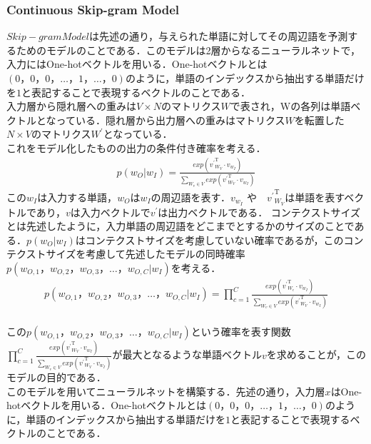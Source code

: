 \subsubsection{Continuous Skip-gram Model}
\label{tech:skipgram}
$ Skip-gram Model $は先述の通り，与えられた単語に対してその周辺語を予測するためのモデルのことである．このモデルは2層からなるニューラルネットで，入力にはOne-hotベクトルを用いる．One-hotベクトルとは$ (0，0，0， \ldots ，1， \ldots ，0) $のように，単語のインデックスから抽出する単語だけを$ 1 $と表記することで表現するベクトルのことである．\\
入力層から隠れ層への重みは$ V \times N $のマトリクス$ W $で表され，Wの各列は単語ベクトルとなっている．隠れ層から出力層への重みはマトリクス$ W $を転置した$ N \times V $のマトリクス$ W^{\prime} $となっている．\\
これをモデル化したものの出力の条件付き確率を考える．
\begin{align}
p(w_{O}|w_{I}) = \frac{exp({{v^{\prime}}^{\mathrm{T}}_{W_{V}}} \cdot v_{w_{I}})}{\sum_{W_{v} \in{V}}exp({{v^{\prime}}^{\mathrm{T}}_{W_{V}}} \cdot v_{w_{I}})} \label{eq:kakuritu}
\end{align}
この$ w_{I} $は入力する単語，$ w_{O} $は$ w_{I} $の周辺語を表す．$ v_{w_{I}} $ や　$ {v^{\prime}}^{\mathrm{T}}_{W_{V}} $は単語を表すベクトルであり，$ v $は入力ベクトルで$ v^{\prime} $は出力ベクトルである．
コンテクストサイズとは先述したように，入力単語の周辺語をどこまでとするかのサイズのことである．$ p(w_{O}|w_{I}) $はコンテクストサイズを考慮していない確率であるが，このコンテクストサイズを考慮して先述したモデルの同時確率$ p(w_{O,1}，w_{O,2}，w_{O,3}， \ldots ，w_{O,C}|w_{I}) $を考える．
\begin{align}
p(w_{O,1}，w_{O,2}，w_{O,3}， \ldots ，w_{O,C}|w_{I}) = \prod_{c=1}^{C} \frac{exp({{v^{\prime}}^{\mathrm{T}}_{W_{c}}} \cdot v_{w_{I}})}{\sum_{W_{v} \in{V}}exp({{v^{\prime}}^{\mathrm{T}}_{W_{V}}} \cdot v_{w_{I}})} \label{eq:douzikakuritu}
\end{align}\\
この$ p(w_{O,1}，w_{O,2}，w_{O,3}， \ldots ，w_{O,C}|w_{I}) $という確率を表す関数$ \prod_{c=1}^{C} \frac{exp({{v^{\prime}}^{\mathrm{T}}_{W_{V}}} \cdot v_{w_{I}})}{\sum_{W_{v} \in{V}}exp({{v^{\prime}}^{\mathrm{T}}_{W_{V}}} \cdot v_{w_{I}})} $が最大となるような単語ベクトル$ v $を求めることが，このモデルの目的である．\\
このモデルを用いてニューラルネットを構築する．先述の通り，入力層$ x $はOne-hotベクトルを用いる．One-hotベクトルとは$ (0，0，0， \ldots ，1， \ldots ，0) $のように，単語のインデックスから抽出する単語だけを$ 1 $と表記することで表現するベクトルのことである．\\

